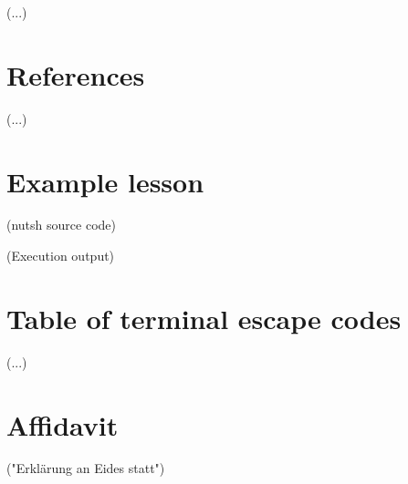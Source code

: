\documentclass[twoside]{scrreprt}
\begin{document}
        (...)

\chapter{References}

        (...)

\appendix

\chapter{Example lesson}

        (nutsh source code)

        (Execution output)

\chapter{Table of terminal escape codes}

        (...)

\chapter*{Affidavit}

        ("Erklärung an Eides statt")
\end{document}
